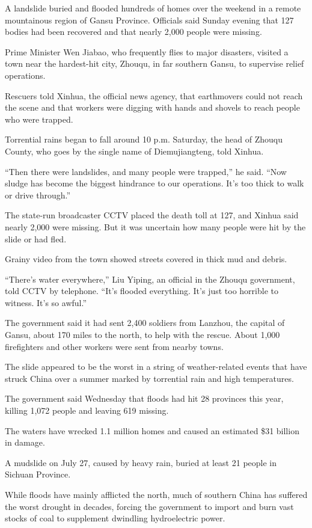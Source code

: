 ﻿\documentclass[12pt]{article}
\begin{document}
\lettrine{A}{} landslide buried and flooded hundreds of homes over the
weekend in a remote mountainous region of Gansu Province. Officials said Sunday evening that 127
bodies had been recovered and that nearly 2,000 people were missing.

Prime Minister Wen Jiabao, who frequently flies to major disasters, visited a town near the
hardest-hit city, Zhouqu, in far southern Gansu, to supervise relief operations.

Rescuers told Xinhua, the official news agency, that earthmovers could not reach the scene and that
workers were digging with hands and shovels to reach people who were trapped.

Torrential rains began to fall around 10 p.m. Saturday, the head of Zhouqu County, who goes by the
single name of Diemujiangteng, told Xinhua.

``Then there were landslides, and many people were trapped,'' he said. ``Now sludge has become the
biggest hindrance to our operations. It's too thick to walk or drive through.''

The state-run broadcaster CCTV placed the death toll at 127, and Xinhua said nearly 2,000 were
missing. But it was uncertain how many people were hit by the slide or had fled.

Grainy video from the town showed streets covered in thick mud and debris.

``There's water everywhere,'' Liu Yiping, an official in the Zhouqu government, told CCTV by
telephone. ``It's flooded everything. It's just too horrible to witness. It's so awful.''

The government said it had sent 2,400 soldiers from Lanzhou, the capital of Gansu, about 170 miles
to the north, to help with the rescue. About 1,000 firefighters and other workers were sent from
nearby towns.

The slide appeared to be the worst in a string of weather-related events that have struck China over
a summer marked by torrential rain and high temperatures.

The government said Wednesday that floods had hit 28 provinces this year, killing 1,072 people and
leaving 619 missing.

The waters have wrecked 1.1 million homes and caused an estimated \$31 billion in damage.

A mudslide on July 27, caused by heavy rain, buried at least 21 people in Sichuan Province.

While floods have mainly afflicted the north, much of southern China has suffered the worst drought
in decades, forcing the government to import and burn vast stocks of coal to supplement dwindling
hydroelectric power.
\end{document}
